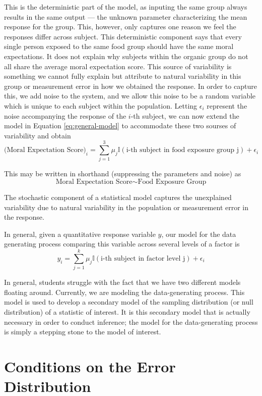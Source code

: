 \documentclass[]{book}
\theoremstyle{definition}
\theoremstyle{definition}
\theoremstyle{definition}
\theoremstyle{remark}
\let\BeginKnitrBlock\begin \let\EndKnitrBlock\end
\begin{document}
This is the deterministic part of the model, as inputing the same group
always results in the same output --- the unknown parameter
characterizing the mean response for the group. This, however, only
captures one reason we feel the responses differ across subject. This
deterministic component says that every single person exposed to the
same food group should have the same moral expectations. It does not
explain why subjects within the organic group do not all share the
average moral expectation score. This source of variability is something
we cannot fully explain but attribute to natural variability in this
group or measurement error in how we obtained the response. In order to
capture this, we add noise to the system, and we allow this noise to be
a random variable which is unique to each subject within the population.
Letting \(\epsilon_i\) represent the noise accompanying the response of
the \(i\)-th subject, we can now extend the model in Equation
\eqref{eq:general-model} to accommodate these two sourses of variability
and obtain \[
\text{(Moral Expectation Score)}_i = \sum_{j=1}^3 \mu_j \mathbb{I}(\text{i-th subject in food exposure group j}) + \epsilon_i
\]

This may be written in shorthand (suppressing the parameters and noise)
as \[ \text{Moral Expectation Score} \sim \text{Food Exposure Group}\]

\BeginKnitrBlock{rmdkeyidea}
The stochastic component of a statistical model captures the unexplained
variability due to natural variability in the population or measurement
error in the response.
\EndKnitrBlock{rmdkeyidea}

\BeginKnitrBlock{rmdtip}
In general, given a quantitative response variable \(y\), our model for
the data generating process comparing this variable across several
levels of a factor is
\[y_i = \sum_{j=1}^k \mu_j \mathbb{I}(\text{i-th subject in factor level j}) + \epsilon_i\]
\EndKnitrBlock{rmdtip}

In general, students struggle with the fact that we have two different
models floating around. Currently, we are modeling the data-generating
process. This model is used to develop a secondary model of the sampling
distribution (or null distribution) of a statistic of interest. It is
this secondary model that is actually necessary in order to conduct
inference; the model for the data-generating process is simply a
stepping stone to the model of interest.

\section{Conditions on the Error
Distribution}\label{conditions-on-the-error-distribution}
\end{document}
